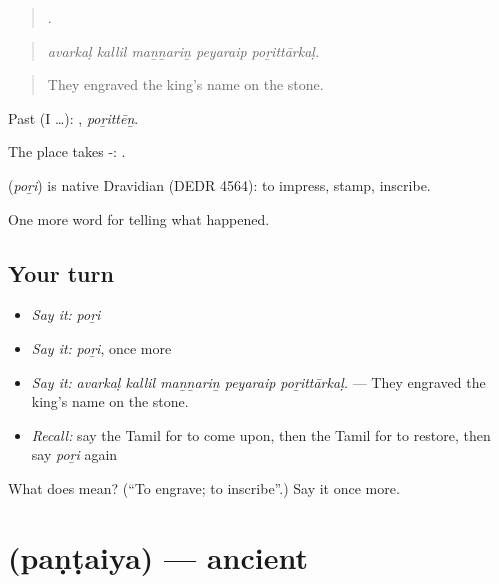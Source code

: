 \begin{quote}
    .
\end{quote}

\begin{quote}
\emph{avarkaḷ kallil maṉṉariṉ peyaraip poṟittārkaḷ.}
\end{quote}

\begin{quote}
They engraved the king's name on the stone.
\end{quote}

Past (I …): , \emph{poṟittēṉ}.

The place takes -:  .

\begin{cousinweb}
\textbf{} (\emph{poṟi}) is native Dravidian (DEDR 4564): to impress, stamp, inscribe.
\end{cousinweb}

\begin{grammarlens}[title={What you've built}]
One more word for telling what happened.
\end{grammarlens}

\subsection*{Your turn}
\begin{itemize}
\raggedright
  \item \emph{Say it:} \emph{poṟi}
  \item \emph{Say it:} \emph{poṟi}, once more
  \item \emph{Say it:} \emph{avarkaḷ kallil maṉṉariṉ peyaraip poṟittārkaḷ.} — They engraved the king's name on the stone.
  \item \emph{Recall:} say the Tamil for to come upon, then the Tamil for to restore, then say \emph{poṟi} again
\end{itemize}

\begin{tcolorbox}[breakable,colback=teal!4,colframe=teal!35!black,title={Before you move on}]
What does  mean? (\textquotedblleft{}To engrave; to inscribe\textquotedblright{}.) Say it once more.
\end{tcolorbox}
\section[\texorpdfstring{\ta{பண்டைய} (paṇṭaiya)}{பண்டைய (paṇṭaiya)}]{ (paṇṭaiya) — ancient}

